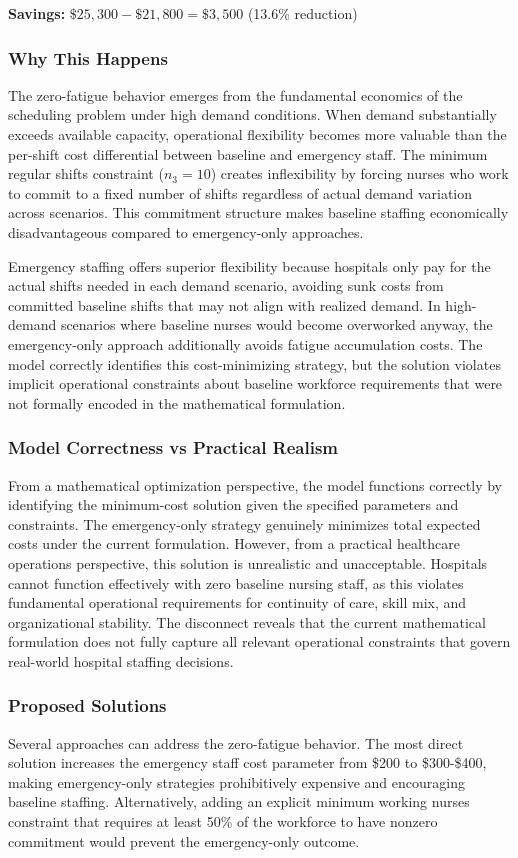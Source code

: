 \documentclass[11pt,letterpaper]{article}
\begin{document}
\textbf{Savings:} $\$25,300 - \$21,800 = \$3,500$ (13.6\% reduction)

\subsubsection{Why This Happens}
The zero-fatigue behavior emerges from the fundamental economics of the scheduling problem under high demand conditions. When demand substantially exceeds available capacity, operational flexibility becomes more valuable than the per-shift cost differential between baseline and emergency staff. The minimum regular shifts constraint ($n_3 = 10$) creates inflexibility by forcing nurses who work to commit to a fixed number of shifts regardless of actual demand variation across scenarios. This commitment structure makes baseline staffing economically disadvantageous compared to emergency-only approaches.

Emergency staffing offers superior flexibility because hospitals only pay for the actual shifts needed in each demand scenario, avoiding sunk costs from committed baseline shifts that may not align with realized demand. In high-demand scenarios where baseline nurses would become overworked anyway, the emergency-only approach additionally avoids fatigue accumulation costs. The model correctly identifies this cost-minimizing strategy, but the solution violates implicit operational constraints about baseline workforce requirements that were not formally encoded in the mathematical formulation.

\subsubsection{Model Correctness vs Practical Realism}
From a mathematical optimization perspective, the model functions correctly by identifying the minimum-cost solution given the specified parameters and constraints. The emergency-only strategy genuinely minimizes total expected costs under the current formulation. However, from a practical healthcare operations perspective, this solution is unrealistic and unacceptable. Hospitals cannot function effectively with zero baseline nursing staff, as this violates fundamental operational requirements for continuity of care, skill mix, and organizational stability. The disconnect reveals that the current mathematical formulation does not fully capture all relevant operational constraints that govern real-world hospital staffing decisions.

\subsubsection{Proposed Solutions}
Several approaches can address the zero-fatigue behavior. The most direct solution increases the emergency staff cost parameter from \$200 to \$300-\$400, making emergency-only strategies prohibitively expensive and encouraging baseline staffing. Alternatively, adding an explicit minimum working nurses constraint that requires at least 50\% of the workforce to have nonzero commitment would prevent the emergency-only outcome.
\end{document}
